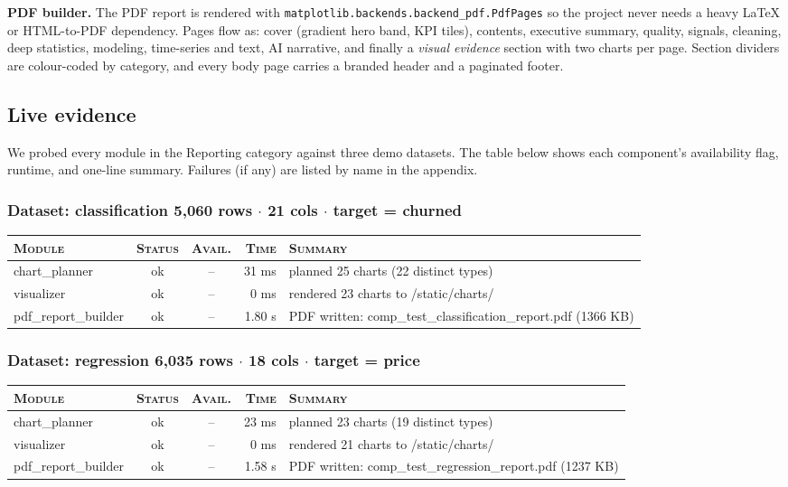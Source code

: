\documentclass[11pt,a4paper]{article}
\begin{document}
\textbf{PDF builder.} The PDF report is rendered with \texttt{matplotlib.backends.backend\_pdf.PdfPages} so the project never needs a heavy LaTeX or HTML-to-PDF dependency. Pages flow as: cover (gradient hero band, KPI tiles), contents, executive summary, quality, signals, cleaning, deep statistics, modeling, time-series and text, AI narrative, and finally a \emph{visual evidence} section with two charts per page. Section dividers are colour-coded by category, and every body page carries a branded header and a paginated footer.

\subsection{Live evidence}

We probed every module in the Reporting category against three
demo datasets. The table below shows each component's availability flag,
runtime, and one-line summary. Failures (if any) are listed by name in the
appendix.


\subsubsection*{Dataset: classification
\hfill {\color{ink3}\footnotesize 5,060 rows
{$\boldsymbol{\cdot}$} 21 cols
{$\boldsymbol{\cdot}$} target = churned}}

\begin{tabularx}{\linewidth}{l c c r X}
\toprule
\textsc{Module} & \textsc{Status} & \textsc{Avail.} & \textsc{Time} & \textsc{Summary} \\
\midrule
chart\_planner & \textcolor{ok}{ok} & -- & 31 ms & planned 25 charts (22 distinct types) \\
visualizer & \textcolor{ok}{ok} & -- & 0 ms & rendered 23 charts to /static/charts/ \\
pdf\_report\_builder & \textcolor{ok}{ok} & -- & 1.80 s & PDF written: comp\_test\_classification\_report.pdf (1366 KB) \\
\bottomrule
\end{tabularx}


\subsubsection*{Dataset: regression
\hfill {\color{ink3}\footnotesize 6,035 rows
{$\boldsymbol{\cdot}$} 18 cols
{$\boldsymbol{\cdot}$} target = price}}

\begin{tabularx}{\linewidth}{l c c r X}
\toprule
\textsc{Module} & \textsc{Status} & \textsc{Avail.} & \textsc{Time} & \textsc{Summary} \\
\midrule
chart\_planner & \textcolor{ok}{ok} & -- & 23 ms & planned 23 charts (19 distinct types) \\
visualizer & \textcolor{ok}{ok} & -- & 0 ms & rendered 21 charts to /static/charts/ \\
pdf\_report\_builder & \textcolor{ok}{ok} & -- & 1.58 s & PDF written: comp\_test\_regression\_report.pdf (1237 KB) \\
\bottomrule
\end{tabularx}
\end{document}
